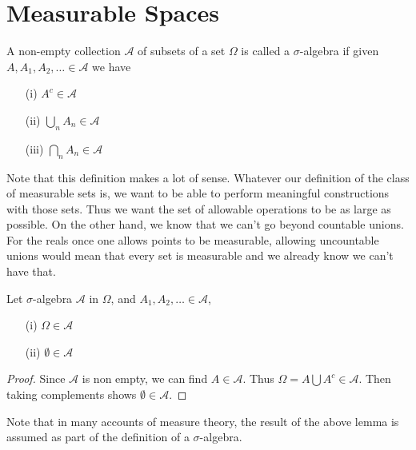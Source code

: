 \section{Measurable Spaces}
\begin{defn}A non-empty collection $\mathcal{A}$ of subsets of a set
  $\Omega$ is called a $\sigma$-algebra if given $A, A_1, A_2, \dots
  \in  \mathcal{A}$ we have
\begin{itemize}
\item[(i)]$A^c \in \mathcal{A}$
\item[(ii)]$\bigcup_n A_n \in \mathcal{A}$
\item[(iii)]$\bigcap_n A_n \in \mathcal{A}$
\end{itemize}
\end{defn}
Note that this definition makes a lot of sense.  Whatever our
definition of the class of measurable sets is, we want to be able to
perform meaningful constructions with those sets.  Thus we want the
set of allowable operations to be as large as possible.  On the other
hand, we know that we can't go beyond countable unions. For the
reals once one allows points to be measurable, allowing uncountable unions would
mean that every set is measurable and we already know we can't have that.
\begin{lem}Let $\sigma$-algebra $\mathcal{A}$ in $\Omega$, and $A_1,
  A_2, \dots \in \mathcal{A}$,
\begin{itemize}
\item[(i)] $\Omega \in \mathcal{A}$
\item[(ii)] $\emptyset \in \mathcal{A}$
\end{itemize}
\end{lem}
\begin{proof}
Since $\mathcal{A}$ is non empty, we can find $A \in \mathcal{A}$.
Thus $\Omega = A \bigcup A^c \in \mathcal{A}$.  Then taking
complements shows $\emptyset \in \mathcal{A}$.
\end{proof}
Note that in many accounts of measure theory, the result of the above lemma is assumed as part of
the definition of a $\sigma$-algebra.

